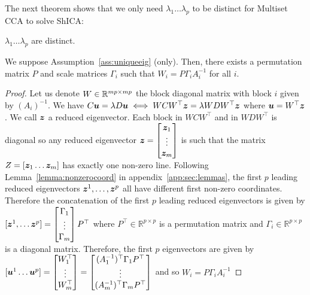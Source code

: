 The next theorem shows that we only need $\lambda_1 \dots \lambda_p$ to be distinct for Multiset CCA to solve ShICA:
\begin{assumption}
  \label{ass:uniqueeig}
$\lambda_1 \dots \lambda_p$ are distinct.
\end{assumption}
\begin{theorem}
  \label{th:eig}
  We suppose
  Assumption~\ref{ass:uniqueeig} (only). Then, there exists a permutation matrix $P$ and scale matrices $\Gamma_i$ such that $W_i = P\Gamma_i A_i^{-1}$ for all $i$.
\end{theorem}
\label{proof:eig}
\begin{proof}
  Let us denote $W \in \mathbb{R}^{mp \times mp}$ the block diagonal matrix with block $i$ given by
  $(A_i)^{-1}$. We have $C \boldsymbol{u} = \lambda D \boldsymbol{u}  \iff W C W^\top \boldsymbol{z} = \lambda W D W^\top \boldsymbol{z}
  $ where $\boldsymbol{u} = W^\top \boldsymbol{z}$. We call $\boldsymbol{z}$ a reduced eigenvector.
  Each
  block in $W C W^\top$ and in $W D W^\top$ is diagonal so any reduced eigenvector $\boldsymbol{z} = \begin{bmatrix} \boldsymbol{z}_1 \\ \vdots \\ \boldsymbol{z}_m \end{bmatrix}$ is
  such that the matrix $Z = [\boldsymbol{z}_1 \dots \boldsymbol{z}_m]$ has exactly one non-zero line.
  Following Lemma~\ref{lemma:nonzerocoord} in appendix~\ref{app:sec:lemmas}, the first $p$ leading reduced
  eigenvectors $\boldsymbol{z}^1, \dots, \boldsymbol{z}^p$ all have different first non-zero coordinates.
  Therefore the concatenation of the first $p$ leading reduced eigenvectors is given
  by $[\boldsymbol{z}^1, \dots \boldsymbol{z}^p] = \begin{bmatrix} \Gamma_1 \\ \vdots \\ \Gamma_m \end{bmatrix} P^{\top}$ where $P^{\top} \in \mathbb{R}^{p \times p}$ is a permutation matrix and $\Gamma_i
  \in \mathbb{R}^{p \times p}$ is a diagonal matrix. Therefore, the first $p$
  eigenvectors are given by $[\boldsymbol{u}^1 \dots \boldsymbol{u}^p] = \begin{bmatrix} W_1^{\top} \\ \vdots \\ W_m^{\top} \end{bmatrix} = \begin{bmatrix} (A_1^{-1})^{\top} \Gamma_1 P^{\top} \\ \vdots \\ (A_m^{-1})^{\top} \Gamma_m P^{\top} \end{bmatrix}$  and so $W_i = P \Gamma_i A_i^{-1}$
\end{proof}

